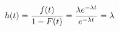 \documentclass[preview]{standalone}
\begin{document}
\begin{align*}
\special{dvisvgm:raw <g id='unique000'>}h(t)=\dfrac{f(t)}{1-F(t)}=\dfrac{\lambda e^{-\lambda t}}{e^{-\lambda t}}=\lambda\special{dvisvgm:raw </g>}
\end{align*}
\end{document}
